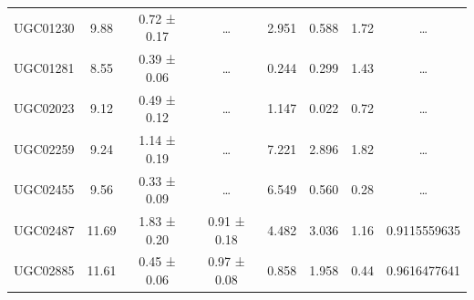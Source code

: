 \documentclass[reprint,%
 amsmath,amssymb,
 aps,
]{revtex4-1}
\begin{document}
\begin{table}[]
\begin{tabular}{cccccrrc}
\rowcolor[HTML]{F3F3F3} 
UGC01230             & 9.88                      & 0.72 ± 0.17           & …                      & 2.951                                                        & 0.588                                                         & 1.72                                                           & …                                                             \\
\rowcolor[HTML]{F3F3F3} 
UGC01281             & 8.55                      & 0.39 ± 0.06           & …                      & 0.244                                                        & 0.299                                                          & 1.43                                                         & …                                                             \\
\rowcolor[HTML]{F3F3F3} 
UGC02023             & 9.12                      & 0.49 ± 0.12           & …                      & 1.147                                                        & 0.022                                                         & 0.72                                                        & …                                                             \\
\rowcolor[HTML]{F3F3F3} 
UGC02259             & 9.24                      & 1.14 ± 0.19           & …                      & 7.221                                                        & 2.896                                                          & 1.82                                                          & …                                                             \\
\rowcolor[HTML]{F3F3F3} 
UGC02455             & 9.56                      & 0.33 ± 0.09           & …                      & 6.549                                                        & 0.560                                                         & 0.28                                                         & …                                                             \\
\rowcolor[HTML]{F3F3F3} 
UGC02487             & 11.69                     & 1.83 ± 0.20           & 0.91 ± 0.18            & 4.482                                                        & 3.036                                                         & 1.16                                                           & \multicolumn{1}{r}{\cellcolor[HTML]{F3F3F3}0.9115559635}      \\
\rowcolor[HTML]{F3F3F3} 
UGC02885             & 11.61                     & 0.45 ± 0.06           & 0.97 ± 0.08            & 0.858                                                        & 1.958                                                          & 0.44                                                           & \multicolumn{1}{r}{\cellcolor[HTML]{F3F3F3}0.9616477641}      \\

\end{tabular}
\end{table}
\end{document}

